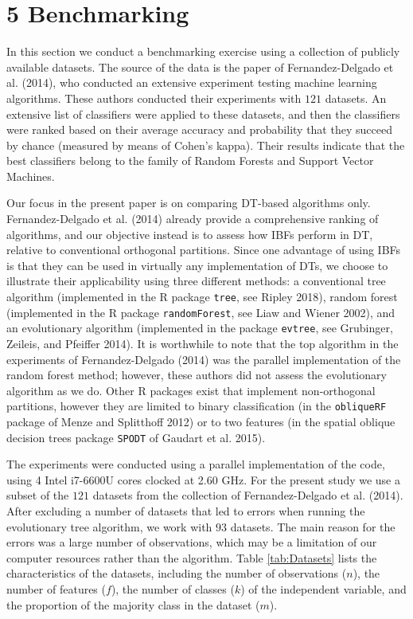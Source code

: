 \documentclass[]{elsarticle} %
\begin{document}
\section{5 Benchmarking}\label{benchmarking}

In this section we conduct a benchmarking exercise using a collection of
publicly available datasets. The source of the data is the paper of
Fernandez-Delgado et al. (2014), who conducted an extensive experiment
testing machine learning algorithms. These authors conducted their
experiments with \(121\) datasets. An extensive list of classifiers were
applied to these datasets, and then the classifiers were ranked based on
their average accuracy and probability that they succeed by chance
(measured by means of Cohen's kappa). Their results indicate that the
best classifiers belong to the family of Random Forests and Support
Vector Machines.

Our focus in the present paper is on comparing DT-based algorithms only.
Fernandez-Delgado et al. (2014) already provide a comprehensive ranking
of algorithms, and our objective instead is to assess how IBFs perform
in DT, relative to conventional orthogonal partitions. Since one
advantage of using IBFs is that they can be used in virtually any
implementation of DTs, we choose to illustrate their applicability using
three different methods: a conventional tree algorithm (implemented in
the R package \texttt{tree}, see Ripley 2018), random forest
(implemented in the R package \texttt{randomForest}, see Liaw and Wiener
2002), and an evolutionary algorithm (implemented in the package
\texttt{evtree}, see Grubinger, Zeileis, and Pfeiffer 2014). It is
worthwhile to note that the top algorithm in the experiments of
Fernandez-Delgado (2014) was the parallel implementation of the random
forest method; however, these authors did not assess the evolutionary
algorithm as we do. Other R packages exist that implement non-orthogonal
partitions, however they are limited to binary classification (in the
\texttt{obliqueRF} package of Menze and Splitthoff 2012) or to two
features (in the spatial oblique decision trees package \texttt{SPODT}
of Gaudart et al. 2015).

The experiments were conducted using a parallel implementation of the
code, using 4 Intel i7-6600U cores clocked at 2.60 GHz. For the present
study we use a subset of the \(121\) datasets from the collection of
Fernandez-Delgado et al. (2014). After excluding a number of datasets
that led to errors when running the evolutionary tree algorithm, we work
with \(93\) datasets. The main reason for the errors was a large number
of observations, which may be a limitation of our computer resources
rather than the algorithm. Table \ref{tab:Datasets} lists the
characteristics of the datasets, including the number of observations
(\(n\)), the number of features (\(f\)), the number of classes (\(k\))
of the independent variable, and the proportion of the majority class in
the dataset (\(m\)).
\end{document}
